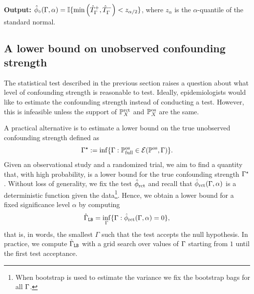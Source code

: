\begin{algorithm*}[t]
\begin{algorithmic}[1]
\State \textbf{Output:} $\hat{\phi}_\diamond(\Gamma,\alpha) =  \mathbb{I} \{\min\left(\hat{T}_\Gamma^+, \hat{T}_\Gamma^- \right) < z_{\alpha/2} \} $, where $z_\alpha$ is the $\alpha$-quantile of the standard normal. 
\end{algorithmic}
\label{algo:test}

\end{algorithm*}
 
\subsection{A lower bound on unobserved confounding strength}
\label{sec:lower_bound}
The statistical test described in the previous section raises a question about what level of confounding strength is reasonable to test. 
Ideally, epidemiologists would like to estimate the confounding strength instead of conducting a test. However, this is infeasible unless the support of $\mathbb{P}^{\operatorname{rct}}_X$ and $\mathbb{P}^{\operatorname{os}}_X$ are the same. 

A practical alternative is to estimate a lower bound on the true unobserved confounding strength defined as
$$
\Gamma^{\star} :=  \inf \{ \Gamma : \mathbb{P} ^{\operatorname{os}}_{\operatorname{full}} \in \mathcal{E}(\mathbb{P}^{\operatorname{os}},\Gamma)\}.
$$
Given an observational study and a randomized trial, we aim to find a quantity that, with high probability, is a lower bound for the true confounding strength $\Gamma^{\star}$. 
Without loss of generality, we fix the test $\hat{\phi}_{\mathrm{rct}}$ and recall that $\hat{\phi}_{\mathrm{rct}}(\Gamma, \alpha) $ is a deterministic function given the data\footnote{When bootstrap is used to estimate the variance we fix the bootstrap bags for all $\Gamma$.}. Hence, we obtain a lower bound for a fixed significance level $\alpha$ by computing
 \begin{equation}
 \label{eq:lb1}
     \hat{\Gamma}_{\texttt{LB}} = \inf_{\Gamma} \{\Gamma: \hat{\phi}_{\mathrm{rct}}(\Gamma,\alpha) =0 \},
 \end{equation}
that is, in words, the smallest $\Gamma$ such that the test accepts the null hypothesis. In practice, we compute $\hat{\Gamma}_{\texttt{LB}}$ with a grid search over values of $\Gamma$ starting from $1$ until the first test acceptance.
 
